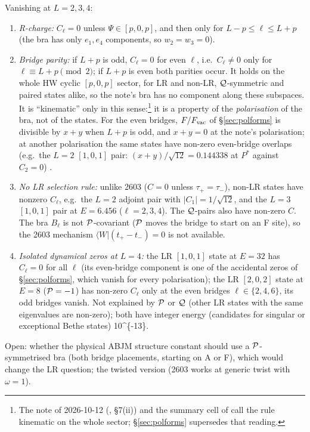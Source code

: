 Vanishing at $L=2,3,4$:
\begin{enumerate}
\item[(i)] \emph{R-charge:} $C_\ell=0$ unless $\Psi\in[p,0,p]$, and then only for $L-p\le\ell\le L+p$ (the bra has only $e_1,e_4$ components, so $w_2=w_3=0$).
\item[(ii)] \emph{Bridge parity:} if $L+p$ is odd, $C_\ell=0$ for even $\ell$, i.e.\ $C_\ell\ne0$ only for $\ell\equiv L+p\pmod2$; if $L+p$ is even both parities occur. It holds on the whole HW cyclic
$[p,0,p]$ sector, for LR and non-LR, $\mathcal Q$-symmetric and paired states alike, so the note's bra has no component along these subspaces. It is ``kinematic'' only in this sense:\footnote{The note of 2026-10-12 (, \S7(ii)) and the summary cell of  call the rule kinematic on the whole sector; \S\ref{sec:polforms} supersedes that reading.}
it is a property of the \emph{polarisation} of the bra, not of the states. For the even bridges, $F/F_{\rm vac}$ of \S\ref{sec:polforms} is divisible by $x+y$ when $L+p$ is odd, and $x+y=0$ at the note's
polarisation; at another polarisation the same states have non-zero even-bridge overlaps (e.g.\ the $L=2$ $[1,0,1]$ pair: $(x+y)/\sqrt{12}=0.144338$ at $P^*$ against $C_2=0$) \npy.
\item[(iii)] \emph{No LR selection rule:} unlike 2603 ($C=0$ unless $\tau_+=\tau_-$), non-LR states have nonzero $C_\ell$, e.g.\ the $L=2$ adjoint pair with $|C_1|=1/\sqrt{12}$, and the $L=3$ $[1,0,1]$ pair at $E=6.456$
($\ell=2,3,4$). The $\mathcal Q$-pairs also have non-zero $C$. The bra $B_\ell$ is not $\mathcal P$-covariant ($\mathcal P$ moves the bridge to start on an F site), so the 2603 mechanism $\langle W|(t_+-t_-)=0$ is not available.
\item[(iv)] \emph{Isolated dynamical zeros at $L=4$:} the LR $[1,0,1]$ state at $E=32$ has $C_\ell=0$ for all $\ell$ (its even-bridge component is one of the accidental zeros of \S\ref{sec:polforms}, which vanish for every polarisation); the LR $[2,0,2]$ state at
$E=8$ ($\mathcal P=-1$) has non-zero $C_\ell$ only at the even bridges $\ell\in\{2,4,6\}$, its odd bridges vanish. Not explained by $\mathcal P$ or $\mathcal Q$ (other LR states with the same eigenvalues are non-zero);
both have integer energy (candidates for singular or exceptional Bethe states) \num{10^{-13}}.
\end{enumerate}
Open: whether the physical ABJM structure constant should use a $\mathcal P$-symmetrised bra (both bridge placements, starting on A or F), which would change the LR question; the twisted version (2603 works at generic twist with $\omega=1$).

